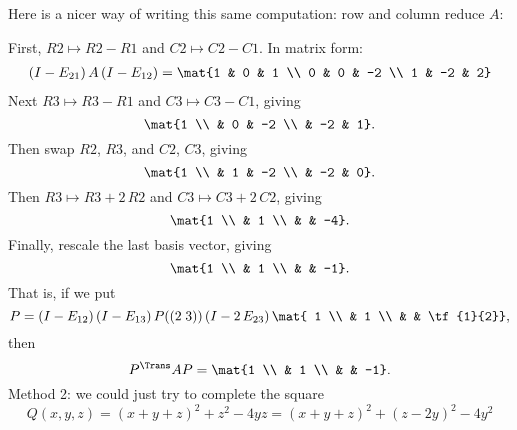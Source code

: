 \begin{example}
		\pagebreak

	Here is a nicer way of writing this same computation: row and column reduce $A$: %
	
	First, $R2 \mapsto R2-R1$ and $C2 \mapsto C2-C1$. In matrix form: %
	\begin{align*}
		\left( I-E_{21} \right) A \left( I-E_{12} \right)
		= \mat{1 & 0 & 1 \\ 0 & 0 & -2 \\ 1 & -2 & 2}
	\end{align*}
	Next $R3 \mapsto R3 - R1$ and $C3 \mapsto C3-C1$, giving
	\begin{equation*}
		\mat{1 \\ & 0 & -2 \\  & -2 & 1}.
	\end{equation*}
	Then swap $R2$, $R3$, and  $C2$, $C3$, giving
	\begin{equation*}
		\mat{1 \\ & 1 & -2 \\ & -2 & 0}.
	\end{equation*}
	Then $R3 \mapsto R3+2\,R2$ and $C3 \mapsto C3 + 2\,C2$, giving
	\begin{equation*}
		\mat{1 \\ & 1 \\ & & -4}.
	\end{equation*}
	Finally, rescale the last basis vector, giving
	\begin{equation*}
		\mat{1 \\ & 1 \\ & & -1}.
	\end{equation*}
	That is, if we put
	\begin{equation*}
		P=\left( I-E_{12} \right)\left( I-E_{13} \right)P((2\;3)) \left( I-2\,E_{23} \right)\mat{ 1 \\ & 1 \\ & & \tf{1}{2}},
	\end{equation*}
	then
	\begin{equation*}
		P^\Trans AP = \mat{1 \\ & 1 \\ & & -1}.
	\end{equation*}
	Method 2: we could just try to complete the square
	\begin{equation*}
		Q(x,y,z) = \left( x+y+z \right)^2 + z^2 - 4yz = \left( x+y+z \right)^2 + \left( z-2y \right)^2 - 4y^2
	\end{equation*}
\end{example}

